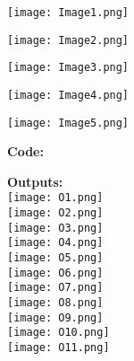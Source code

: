 \documentclass[11]{article}
\begin{document}
\texttt{[image: Image1.png]}\\ \vspace{1cm}

\texttt{[image: Image2.png]}\\ \vspace{1cm}



\texttt{[image: Image3.png]}\\ \vspace{1cm}



\texttt{[image: Image4.png]}\\ \vspace{1cm}



\texttt{[image: Image5.png]}\\ \vspace{1cm}



 
\newpage
\textbf{Code:} \vspace{1cm}

\newpage

\textbf{Outputs:} \\ \vspace{1cm}
\texttt{[image: O1.png]}\\  \vspace{1cm}\texttt{[image: O2.png]}\\  \vspace{1cm}\texttt{[image: O3.png]}\\  \vspace{1cm} \texttt{[image: O4.png]}\\  \vspace{1cm} 
\texttt{[image: O5.png]}\\  \vspace{1cm} \texttt{[image: O6.png]}\\  \vspace{1cm} \texttt{[image: O7.png]}\\  \vspace{1cm} \texttt{[image: O8.png]}\\  \vspace{1cm} \texttt{[image: O9.png]}\\   \vspace{1cm} \texttt{[image: O10.png]}\\  \vspace{1cm} 
\texttt{[image: O11.png]}\\  \vspace{1cm} 
\end{document}
